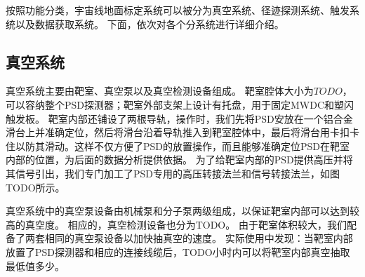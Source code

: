 按照功能分类，宇宙线地面标定系统可以被分为真空系统、径迹探测系统、触发系统以及数据获取系统。
下面，依次对各个分系统进行详细介绍。

\subsection{真空系统}
\label{sec:cosmic_ray:vacuum_system}
真空系统主要由靶室、真空泵以及真空检测设备组成。
靶室腔体大小为$TODO$，可以容纳整个PSD探测器；靶室外部支架上设计有托盘，用于固定MWDC和塑闪触发板。
靶室内部还铺设了两根导轨，操作时，我们先将PSD安放在一个铝合金滑台上并准确定位，然后将滑台沿着导轨推入到靶室腔体中，最后将滑台用卡扣卡住以防其滑动。这样不仅方便了PSD的放置操作，而且能够准确定位PSD在靶室内部的位置，为后面的数据分析提供依据。
为了给靶室内部的PSD提供高压并将其信号引出，我们专门加工了PSD专用的高压转接法兰和信号转接法兰，如图TODO所示。

真空系统中的真空泵设备由机械泵和分子泵两级组成，以保证靶室内部可以达到较高的真空度。
相应的，真空检测设备也分为TODO。
由于靶室体积较大，我们配备了两套相同的真空泵设备以加快抽真空的速度。
实际使用中发现：当靶室内部放置了PSD探测器和相应的连接线缆后，TODO小时内可以将靶室内部真空抽取最低值多少。

